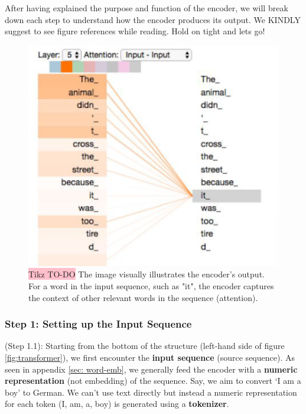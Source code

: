 After having explained the purpose and function of the encoder, we will break down each step to understand how the encoder produces its output. We KINDLY suggest to see figure references while reading. Hold on tight and lets go!

\begin{figure}[!htbp]
    \centering
    \includegraphics[width=\linewidth]{tikz/Encoder Goal.png}
    \caption{{\color{red}\colorbox{pink}{Tikz TO-DO}} The image visually illustrates the encoder's output. For a word in the input sequence, such as "it", the encoder captures the context of other relevant words in the sequence (attention).}
    \label{fig:encoder-goal}
\end{figure}

\subsubsection{Step 1: Setting up the Input Sequence}

(Step 1.1): Starting from the bottom of the structure (left-hand side of figure \ref{fig:transformer}), we first encounter the \textbf{input sequence} (source sequence). As seen in appendix \ref{sec: word-emb}, we generally feed the encoder with a \textbf{numeric representation} (not embedding) of the sequence. Say, we aim to convert ‘I am a boy’ to German. We can't use text directly but instead a numeric representation  for each token (I, am, a, boy) is generated using a \textbf{tokenizer}.

